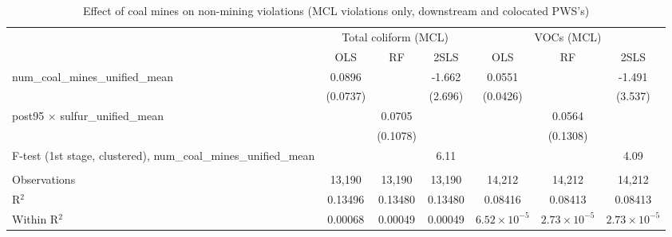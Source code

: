 
\begin{table}[htbp]
   
   \caption{\label{2sls_dwnstrmcolocate_nonminevio_mcl} Effect of coal mines on non-mining violations (MCL violations only, downstream and colocated PWS's)}
   \bigskip
   
   \centering
   
   \begin{adjustbox}{width = \textwidth, center}
      
      
      \begin{tabular}{lcccccc}
         \toprule
         
          & \multicolumn{3}{c}{Total coliform (MCL)} & \multicolumn{3}{c}{VOCs (MCL)}\\
         
                                                                            & OLS           & RF            & 2SLS          & OLS                   & RF                    & 2SLS\\  
         
         \midrule 
         num\_coal\_mines\_unified\_mean                                    & 0.0896        &               & -1.662        & 0.0551                &                       & -1.491\\   
                                                                            & (0.0737)      &               & (2.696)       & (0.0426)              &                       & (3.537)\\   
         post95 $\times$ sulfur\_unified\_mean                              &               & 0.0705        &               &                       & 0.0564                &   \\   
                                                                            &               & (0.1078)      &               &                       & (0.1308)              &   \\   
         
         F-test (1st stage, clustered), num\_coal\_mines\_unified\_mean     &               &               & 6.11          &                       &                       & 4.09\\  
         
          \\
         
         Observations                                                       & 13,190        & 13,190        & 13,190        & 14,212                & 14,212                & 14,212\\  
         R$^2$                                                              & 0.13496       & 0.13480       & 0.13480       & 0.08416               & 0.08413               & 0.08413\\  
         Within R$^2$                                                       & 0.00068       & 0.00049       & 0.00049       & $6.52\times 10^{-5}$  & $2.73\times 10^{-5}$  & $2.73\times 10^{-5}$\\   
         

\end{tabular}
\end{adjustbox}
\end{table}

